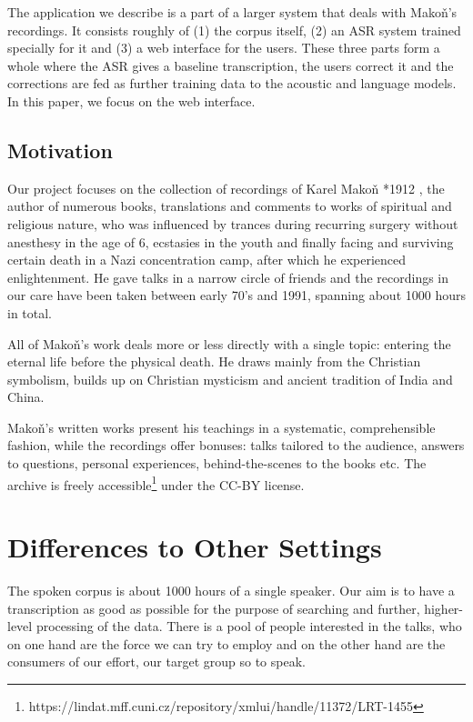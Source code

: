 \documentclass{svproc}
\begin{document}
The application we describe is a part of a larger system that deals with
Mako\v{n}'s recordings. It consists roughly of (1) the corpus itself, (2) an ASR
system trained specially for it and (3) a web interface for the users. These
three parts form a whole where the ASR gives a baseline transcription, the users
correct it and the corrections are fed as further training data to the acoustic
and language models. In this paper, we focus on the web interface.

\subsection{Motivation}

Our project focuses on the collection of recordings of Karel
Mako\v{n}\cite{hajek2007cesky} *1912 , the author of numerous
books, translations and comments to works of spiritual and religious nature, who
was influenced by trances during recurring surgery without anesthesy in the age
of 6, ecstasies in the youth and finally facing and surviving certain death in a
Nazi concentration camp, after which he experienced enlightenment. He gave talks
in a narrow circle of friends and the recordings in our care have been taken
between early 70's and 1991, spanning about 1000 hours in total.

All of Mako\v{n}'s work deals more or less directly with a single topic:
entering the eternal life before the physical death. He draws mainly from the
Christian symbolism, builds up on Christian mysticism and ancient tradition of
India and China.

Mako\v{n}'s written works present his teachings in a systematic, comprehensible
fashion, while the recordings offer bonuses: talks tailored to the audience,
answers to questions, personal experiences, behind-the-scenes to the books etc.
The archive is freely
accessible\footnote{https://lindat.mff.cuni.cz/repository/xmlui/handle/11372/LRT-1455}
under the CC-BY license.

\section{Differences to Other Settings}

The spoken corpus is about 1000 hours of a single
speaker. Our aim is to have a transcription as good as possible for the purpose
of searching and further, higher-level processing of the data. There is a pool
of people interested in the talks, who on one hand are the force we can try to
employ and on the other hand are the consumers of our effort, our target group
so to speak.
\end{document}
